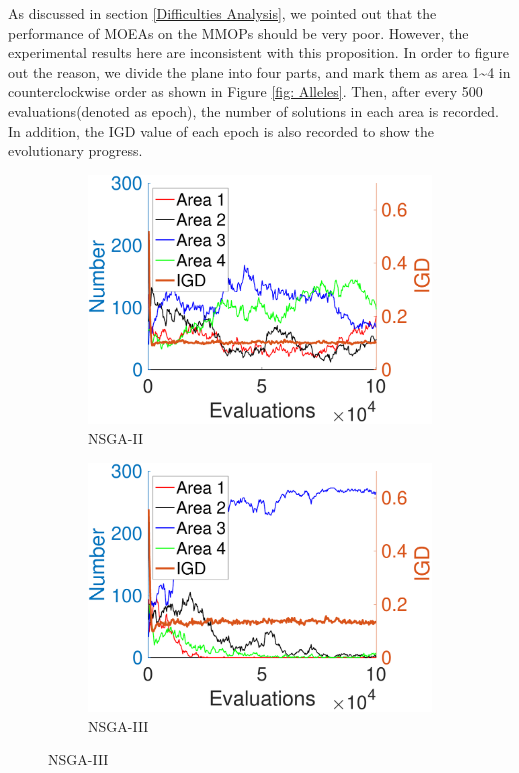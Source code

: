 \documentclass[conference]{IEEEtran}
\begin{document}
As discussed in section \ref{Difficulties Analysis}, we pointed out that the performance of MOEAs on the MMOPs should be very poor. However, the experimental results here are inconsistent with this proposition. In order to figure out the reason, we divide the plane into four parts, and mark them as area 1\textasciitilde 4 in counterclockwise order as shown in Figure \ref{fig: Alleles}. Then, after every 500 evaluations(denoted as epoch), the number of solutions in each area is recorded. In addition, the IGD value of each epoch is also recorded to show the evolutionary progress. 

\begin{figure}[htbp]
    \centering
    \begin{subfigure}[b]{.22\textwidth}
    \includegraphics[width=\linewidth]{Section5/dim2/Diversity/NSGAII}
    \caption{NSGA-II}
    \end{subfigure}
    \begin{subfigure}[b]{.22\textwidth}
    \includegraphics[width=\linewidth]{Section5/dim2/Diversity/NSGAIII}
    \caption{NSGA-III}
    \label{fig: NSGA-III Diversity dim=2}
    

\end{subfigure}
\end{figure}
\end{document}
